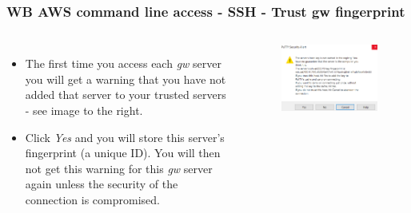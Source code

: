 \documentclass[aspectratio=169]{beamer} %
\begin{document}
\begin{frame}
	\frametitle{WB AWS command line access - SSH - Trust gw fingerprint}
	\begin{columns}[c]
		\begin{itemize}
			\setlength\itemsep{1em}
			\item The first time you access each \textit{gw} server 
			you will get a warning that you have not 
			added that server to your trusted servers -
			see image to the right.
			\item Click \textit{Yes} and you will store this server's fingerprint (a unique ID).
			You will then not get this warning for this \textit{gw} server again
			unless the security of the connection is compromised.
		\end{itemize}
		
		\begin{figure}
			\centering
			\includegraphics[width=\textwidth]{./img/access-1a.png}
		\end{figure}
		
	\end{columns}
\end{frame}
\end{document}
